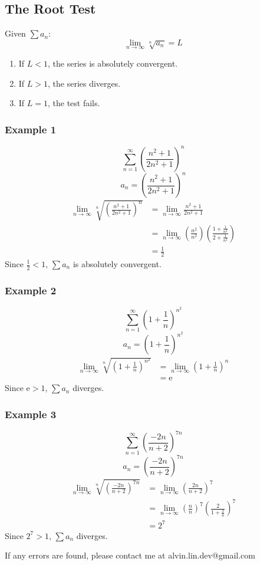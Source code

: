 \documentclass[letterpaper, 12pt]{article}
\newcommand*{\e}{\mathrm{e}}
\begin{document}
\subsection*{The Root Test}
Given \( \sum{a_{n}} \):
\[ \lim_{n\to\infty}\sqrt[n]{a_{n}} = L \]
\begin{enumerate}
  \item If \( L < 1 \), the series is absolutely convergent.
  \item If \( L > 1 \), the series diverges.
  \item If \( L = 1 \), the test fails.
\end{enumerate}

\subsubsection*{Example 1}
\[ \sum_{n=1}^{\infty}(\frac{n^{2}+1}{2n^{2}+1})^{n} \]
\[ a_{n} = (\frac{n^{2}+1}{2n^{2}+1})^{n} \]
\begin{align*}
  \lim_{n\to\infty}\sqrt[n]{(\frac{n^{2}+1}{2n^{2}+1})^{n}} &=
    \lim_{n\to\infty}\frac{n^{2}+1}{2n^{2}+1} \\
  &= \lim_{n\to\infty}
    (\frac{n^{2}}{n^{2}})(\frac{1+\frac{1}{n^{2}}}{2+\frac{1}{n^{2}}}) \\
  &= \frac{1}{2}
\end{align*}
Since \( \frac{1}{2} < 1 \), \( \sum{a_{n}} \) is absolutely convergent.

\subsubsection*{Example 2}
\[ \sum_{n=1}^{\infty}(1+\frac{1}{n})^{n^{2}} \]
\[ a_{n} = (1+\frac{1}{n})^{n^{2}} \]
\begin{align*}
  \lim_{n\to\infty}\sqrt[n]{(1+\frac{1}{n})^{n^{2}}} &=
    \lim_{n\to\infty}(1+\frac{1}{n})^{n} \\
  &= \e
\end{align*}
Since \( \e > 1 \), \( \sum{a_{n}} \) diverges.

\subsubsection*{Example 3}
\[ \sum_{n=1}^{\infty}(\frac{-2n}{n+2})^{7n} \]
\[ a_{n} = (\frac{-2n}{n+2})^{7n} \]
\begin{align*}
  \lim_{n\to\infty}\sqrt[n]{(\frac{-2n}{n+2})^{7n}} &=
    \lim_{n\to\infty}(\frac{2n}{n+2})^{7} \\
  &= \lim_{n\to\infty}(\frac{n}{n})^{7}(\frac{2}{1+\frac{2}{n}})^{7} \\
  &= 2^{7}
\end{align*}
Since \( 2^{7} > 1 \), \( \sum{a_{n}} \) diverges.

\begin{center}
  If any errors are found, please contact me at alvin.lin.dev@gmail.com
\end{center}
\end{document}
